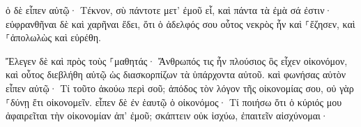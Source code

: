 \documentclass{openreader}
\begin{document}
ὁ δὲ εἶπεν αὐτῷ· Τέκνον, σὺ πάντοτε μετ’ ἐμοῦ εἶ, καὶ πάντα τὰ ἐμὰ σά ἐστιν· 
εὐφρανθῆναι δὲ καὶ χαρῆναι ἔδει, ὅτι ὁ ἀδελφός σου οὗτος νεκρὸς ἦν καὶ ⸀ἔζησεν, καὶ ⸀ἀπολωλὼς καὶ εὑρέθη. 

Ἔλεγεν δὲ καὶ πρὸς τοὺς ⸀μαθητάς· Ἄνθρωπός τις ἦν πλούσιος ὃς εἶχεν οἰκονόμον, καὶ οὗτος διεβλήθη αὐτῷ ὡς διασκορπίζων τὰ ὑπάρχοντα αὐτοῦ. 
καὶ φωνήσας αὐτὸν εἶπεν αὐτῷ· Τί τοῦτο ἀκούω περὶ σοῦ; ἀπόδος τὸν λόγον τῆς οἰκονομίας σου, οὐ γὰρ ⸀δύνῃ ἔτι οἰκονομεῖν. 
εἶπεν δὲ ἐν ἑαυτῷ ὁ οἰκονόμος· Τί ποιήσω ὅτι ὁ κύριός μου ἀφαιρεῖται τὴν οἰκονομίαν ἀπ’ ἐμοῦ; σκάπτειν οὐκ ἰσχύω, ἐπαιτεῖν αἰσχύνομαι· 
\end{document}
